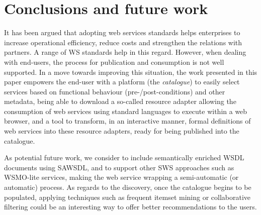 
\section{Conclusions and future work}
\label{sec:conclusions}

It has been argued that adopting web services standards helps enterprises to increase operational efficiency, reduce costs and strengthen the relations with partners. 
A range of WS standards help in this regard.
However, when dealing with end-users, the process for publication and consumption is not well supported. 
In a move towards improving this situation, the work presented in this paper empowers the end-user with a platform (the \emph{catalogue}) to easily select services based on functional behaviour (pre-/post-conditions) and other metadata, being able to download a so-called resource adapter allowing the consumption of web services using standard languages to execute within a web browser, and a tool to transform, in an interactive manner, formal definitions of web services into these resource adapters, ready for being published into the catalogue.

As potential future work, we consider to include semantically enriched WSDL documents using SAWSDL, and to support other SWS approaches such as WSMO-lite services, making the web service wrapping a semi-automatic (or automatic) process. As regards to the discovery, once the catalogue begins to be populated, applying techniques such as frequent itemset mining or collaborative filtering could be an interesting way to offer better recommendations to the users.


